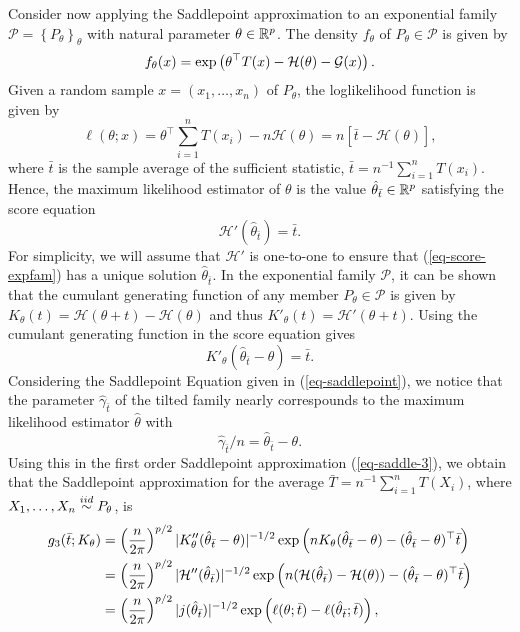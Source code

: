 Consider now applying the Saddlepoint approximation to an exponential family $\mathcal{P} = \left\{P_\theta\right\}_{\theta}$ with natural parameter $\theta \in {\mathbb{R}^p}$. The density $f_\theta$ of $P_\theta \in \mathcal{P}$ is given by
\begin{equation*}
    f_\theta(x) = \exp\left(\theta^\top T(x) - \mathcal{H}(\theta) - \mathcal{G}(x)\right).
\end{equation*}
Given a random sample $x = (x_1, \ldots, x_n)$ of $P_\theta$, the loglikelihood function is given by
\begin{equation*}
    \ell(\theta; x) = \theta^\top \sum_{i=1}^n T(x_i) - n \mathcal{H}(\theta) = n\left[\bar t - \mathcal{H}(\theta)\right],
\end{equation*}
where $\bar t$ is the sample average of the sufficient statistic, $\bar t = n^{-1}\sum_{i=1}^n T(x_i)$. Hence, the maximum likelihood estimator of $\theta$ is the value $\hat\theta_{\bar t} \in {\mathbb{R}^p}$ satisfying the score equation
\begin{equation} \label{eq-score-expfam}
    \mathcal{H}'(\hat\theta_{\bar t}) = \bar t.
\end{equation}
For simplicity, we will assume that $\mathcal{H}'$ is one-to-one to ensure that (\ref{eq-score-expfam}) has a unique solution $\hat\theta_{\bar t}$. In the exponential family $\mathcal{P}$, it can be shown that the cumulant generating function of any member $P_\theta \in \mathcal{P}$ is given by $K_\theta(t) = \mathcal{H}(\theta + t) - \mathcal{H}(\theta)$ and thus $K'_\theta(t) = \mathcal{H}'(\theta + t)$. Using the cumulant generating function in the score equation gives
\begin{equation*}
    K'_\theta(\hat\theta_{\bar t} - \theta) = \bar t.
\end{equation*}
Considering the Saddlepoint Equation given in (\ref{eq-saddlepoint}), we notice that the  parameter $\hat\gamma_{\bar t}$ of the tilted family nearly correspounds to the maximum likelihood estimator $\hat\theta$ with
\begin{equation*}
    \hat\gamma_{\bar t}/n = \hat\theta_{\bar t} - \theta.
\end{equation*}
Using this in the first order Saddlepoint approximation (\ref{eq-saddle-3}), we obtain that the Saddlepoint approximation for the average $\bar T = n^{-1}\sum_{i=1}^n T(X_i)$,  where $X_1, \ldots, X_n \stackrel{iid}{\sim} P_\theta$, is
\begin{align*}
    g_3(\bar t; K_\theta) 
    &= \left(\frac{n}{2\pi}\right)^{p/2}|K_\theta''(\hat\theta_{\bar t} - \theta)|^{-1/2} \exp\left(nK_\theta(\hat\theta_{\bar t} - \theta) - (\hat\theta_{\bar t} - \theta)^\top \bar t\right)\\
    &= \left(\frac{n}{2\pi}\right)^{p/2}|\mathcal{H}''(\hat\theta_{\bar t})|^{-1/2} \exp\left(n(\mathcal{H}(\hat\theta_{\bar t}) - \mathcal{H}(\theta)) - (\hat\theta_{\bar t} - \theta)^\top \bar t\right)\\
    &= \left(\frac{n}{2\pi}\right)^{p/2}|j(\hat\theta_{\bar t})|^{-1/2} \exp\left(\ell(\theta; \bar t) - \ell(\hat\theta_{\bar t}; \bar t)\right),
\end{align*}
